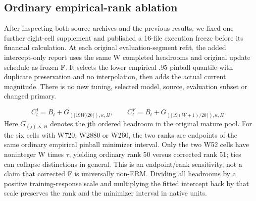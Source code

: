 \documentclass[11pt,a4paper]{article}
\begin{document}
\subsection*{Ordinary empirical-rank ablation}
After inspecting both source archives and the previous results, we fixed one further eight-cell supplement and published a 16-file execution freeze before its financial calculation. At each original evaluation-segment refit, the added intercept-only report uses the same W completed headrooms and original update schedule as frozen F. It selects the lower empirical .95 pinball quantile with duplicate preservation and no interpolation, then adds the actual current magnitude. There is no new tuning, selected model, source, evaluation subset or changed primary.

\[
C^I_t=B_t+G_{(\lceil19W/20\rceil),\kappa,H},\qquad C^F_t=B_t+G_{(\lceil19(W+1)/20\rceil),\kappa,H}.
\]
Here \(G_{(j),\kappa,H}\) denotes the jth ordered headroom in the original mature pool. For the six cells with W720, W2880 or W260, the two ranks are endpoints of the same ordinary empirical pinball minimizer interval. Only the two W52 cells have noninteger W times \(\tau\), yielding ordinary rank 50 versus corrected rank 51; ties can collapse distinctions in general. This is an endpoint/rank sensitivity, not a claim that corrected F is universally non-ERM. Dividing all headrooms by a positive training-response scale and multiplying the fitted intercept back by that scale preserves the rank and the minimizer interval in native units.
\end{document}

